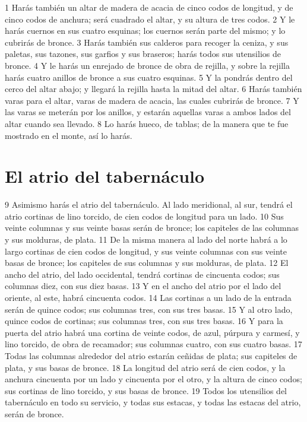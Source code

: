 1 Harás también un altar de madera de acacia de cinco codos   de longitud, y de cinco codos de anchura; será cuadrado el altar, y su altura de tres codos.
2 Y le harás cuernos en sus cuatro esquinas; los cuernos serán parte del mismo; y lo cubrirás de bronce.
3 Harás también sus calderos para recoger la ceniza, y sus paletas, sus tazones, sus garfios y sus braseros; harás todos sus utensilios de bronce.
4 Y le harás un enrejado de bronce de obra de rejilla, y sobre la rejilla harás cuatro anillos de bronce a sus cuatro esquinas.
5 Y la pondrás dentro del cerco del altar abajo; y llegará la rejilla hasta la mitad del altar.
6 Harás también varas para el altar, varas de madera de acacia, las cuales cubrirás de bronce.
7 Y las varas se meterán por los anillos, y estarán aquellas varas a ambos lados del altar cuando sea llevado.
8 Lo harás hueco, de tablas; de la manera que te fue mostrado en el monte, así lo harás.

\section*{El atrio del tabernáculo}

9 Asimismo harás el atrio del tabernáculo. Al lado meridional, al sur, tendrá el atrio cortinas de lino torcido, de cien codos   de longitud para un lado.
10 Sus veinte columnas y sus veinte basas serán de bronce; los capiteles de las columnas y sus molduras, de plata.
11 De la misma manera al lado del norte habrá a lo largo cortinas de cien codos   de longitud, y sus veinte columnas con sus veinte basas de bronce; los capiteles de sus columnas y sus molduras, de plata.
12 El ancho del atrio, del lado occidental, tendrá cortinas de cincuenta codos; sus columnas diez, con sus diez basas.
13 Y en el ancho del atrio por el lado del oriente, al este, habrá cincuenta codos.
14 Las cortinas a un lado de la entrada serán de quince codos;  sus columnas tres, con sus tres basas.
15 Y al otro lado, quince codos   de cortinas; sus columnas tres, con sus tres basas.
16 Y para la puerta del atrio habrá una cortina de veinte codos, de azul, púrpura y carmesí, y lino torcido, de obra de recamador; sus columnas cuatro, con sus cuatro basas.
17 Todas las columnas alrededor del atrio estarán ceñidas de plata; sus capiteles de plata, y sus basas de bronce.
18 La longitud del atrio será de cien codos,  y la anchura cincuenta por un lado y cincuenta por el otro, y la altura de cinco codos; sus cortinas de lino torcido, y sus basas de bronce.
19 Todos los utensilios del tabernáculo en todo su servicio, y todas sus estacas, y todas las estacas del atrio, serán de bronce.

